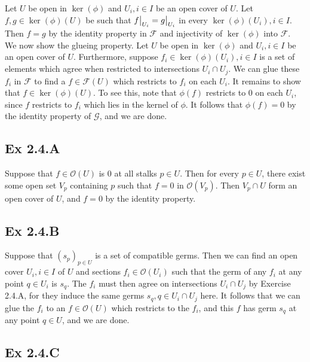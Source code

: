 \documentclass{article}
\newcommand\restr[2]{{%
  \left.\kern-\nulldelimiterspace %
  #1 %
  \vphantom{\big|} %
  \right|_{#2} %
  }}
\theoremstyle{definition}
\begin{document}
Let $U$ be open in $\ker(\phi)$ and $U_i, i \in I$ be an open cover of $U$. Let
$f, g \in \ker(\phi)(U)$ be such that $\restr{f}{U_i} = \restr{g}{U_i}$ in
every $\ker(\phi)(U_i), i \in I$. Then $f = g$ by the identity property in
$\mathcal{F}$ and injectivity of $\ker(\phi)$ into $\mathcal{F}$. \\

We now show the glueing property. Let $U$ be open in $\ker(\phi)$ and $U_i, i
	\in I$ be an open cover of $U$. Furthermore, suppose $f_i \in \ker(\phi)(U_i),
	i \in I$ is a set of elements which agree when restricted to intersections $U_i
	\cap U_j$. We can glue these $f_i$ in $\mathcal{F}$ to find a $f \in
	\mathcal{F}(U)$ which restricts to $f_i$ on each $U_i$. It remains to show that
$f \in \ker(\phi)(U)$. To see this, note that $\phi(f)$ restricts to $0$ on
each $U_i$, since $f$ restricts to $f_i$ which lies in the kernel of $\phi$. It follows
that $\phi(f) = 0$ by the identity property of $\mathcal{G}$, and we are done.


\subsection*{Ex 2.4.A}

Suppose that $f \in \mathcal{O}(U)$ is $0$ at all stalks $p \in U$. Then for
every $p \in U$, there exist some open set $V_p$ containing $p$ such that $f =
	0$ in $\mathcal{O}(V_p)$. Then $V_p \cap U$ form an open cover of $U$, and $f =
	0$ by the identity property.

\subsection*{Ex 2.4.B}

Suppose that $(s_p)_{p \in U}$ is a set of compatible germs. Then we can find
an open cover $U_i,i \in I$ of $U$ and sections $f_i \in \mathcal{O}(U_i)$ such
that the germ of any $f_i$ at any point $q \in U_i$ is $s_q$. The $f_i$ must
then agree on intersections $U_i \cap U_j$ by Exercise 2.4.A, for they induce
the same germs $s_q, q \in U_i \cap U_j$ here. It follows that we can glue the
$f_i$ to an $f \in \mathcal{O}(U)$ which restricts to the $f_i$, and this $f$
has germ $s_q$ at any point $q \in U$, and we are done.

\subsection*{Ex 2.4.C}
\end{document}
